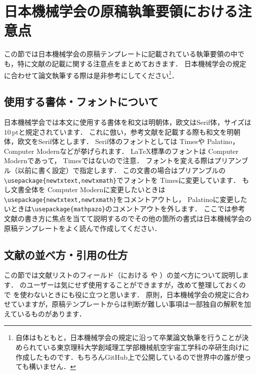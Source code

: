\section{日本機械学会の原稿執筆要領における注意点}
\label{sec:caution}
この節では日本機械学会の原稿テンプレートに記載されている執筆要領の中でも，特に文献の記載に関する注意点をまとめておきます．
日本機械学会の規定に合わせて論文執筆する際は是非参考にしてください\footnote{\JSMErepos 自体はもともと，日本機械学会の規定に沿って卒業論文執筆を行うことが決められている東京理科大学創域理工学部機械航空宇宙工学科の卒研生向けに作成したものです．もちろんGitHub上で公開しているので世界中の誰が使っても構いません．}．

\subsection{使用する書体・フォントについて}
日本機械学会では本文に使用する書体を和文は明朝体，欧文はSerif体，サイズは$10\,\mathrm{pt}$と規定されています．
これに倣い，参考文献を記載する際も和文を明朝体，欧文をSerif体とします．
Serif体のフォントとしては{ Times}や{ Palatino}，{ Computer Modern}などが挙げられます．
\LaTeX{}標準のフォントは{ Computer Modern}であって，{ Times}ではないので注意．
フォントを変える際はプリアンブル（\verb||以前に書く設定）で指定します．
この文書の場合はプリアンブルの\verb|\usepackage{newtxtext,newtxmath}|でフォントを{ Times}に変更しています．
もし文書全体を{ Computer Modern}に変更したいときは\verb|\usepackage{newtxtext,newtxmath}|をコメントアウトし，{ Palatino}に変更したいときは\verb|\usepackage{mathpazo}|のコメントアウトを外します．
ここでは参考文献の書き方に焦点を当てて説明するのでその他の箇所の書式は日本機械学会の原稿テンプレートをよく読んで作成してください．

\subsection{文献の並べ方・引用の仕方}
この節では文献リストのフィールド（\BibTeX における \ttauthor や \tttitle）の並べ方について説明します．
\jsmefile のユーザーは気にせず使用することができますが，改めて整理しておくので \jsmefile を使わないときにも役に立つと思います．
原則，日本機械学会の規定に合わせていますが，原稿テンプレートからは判断が難しい事項は一部独自の解釈を加えているものがあります．

